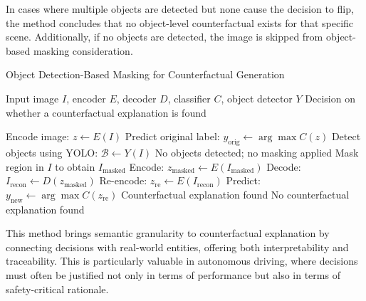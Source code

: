 In cases where multiple objects are detected but none cause the decision to flip, the method concludes that no object-level counterfactual exists for that specific scene. Additionally, if no objects are detected, the image is skipped from object-based masking consideration.

\vspace{1em}
\begin{algorithm}[h]
\caption{Object Detection-Based Masking for Counterfactual Generation}
\label{alg:object_detection_masking}
\begin{algorithmic}[1]
\REQUIRE Input image $I$, encoder $E$, decoder $D$, classifier $C$, object detector $Y$
\ENSURE Decision on whether a counterfactual explanation is found

\STATE Encode image: $z \leftarrow E(I)$
\STATE Predict original label: $y_{\text{orig}} \leftarrow \arg\max C(z)$
\STATE Detect objects using YOLO: $\mathcal{B} \leftarrow Y(I)$
    \RETURN No objects detected; no masking applied
\ENDIF
{}
    \STATE Mask region in $I$ to obtain $I_{\text{masked}}$
    \STATE Encode: $z_{\text{masked}} \leftarrow E(I_{\text{masked}})$
    \STATE Decode: $I_{\text{recon}} \leftarrow D(z_{\text{masked}})$
    \STATE Re-encode: $z_{\text{re}} \leftarrow E(I_{\text{recon}})$
    \STATE Predict: $y_{\text{new}} \leftarrow \arg\max C(z_{\text{re}})$
        \RETURN Counterfactual explanation found
    \ENDIF
\ENDFOR
\RETURN No counterfactual explanation found
\end{algorithmic}
\end{algorithm}
\vspace{1em}

This method brings semantic granularity to counterfactual explanation by connecting decisions with real-world entities, offering both interpretability and traceability. This is particularly valuable in autonomous driving, where decisions must often be justified not only in terms of performance but also in terms of safety-critical rationale.

